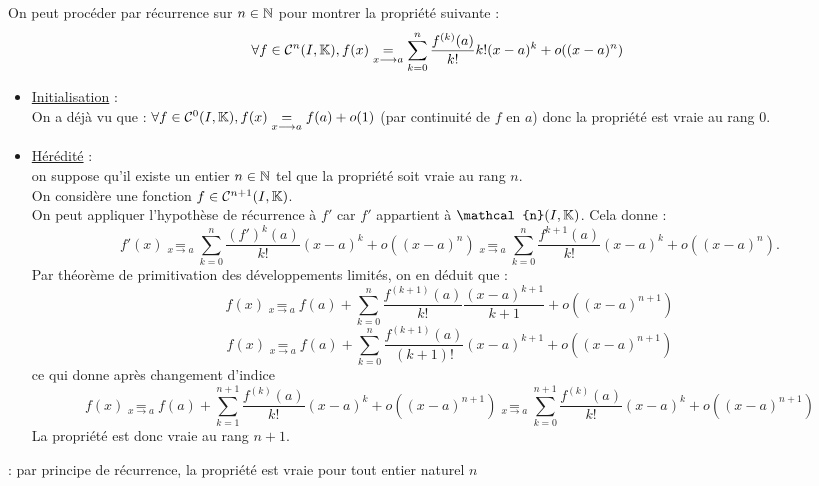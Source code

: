 \begin{dem}
    On peut procéder par récurrence sur \(n \in \mathbb{N}\) pour montrer la propriété suivante :
    \[\forall f \in \mathcal{C}^n(I, \mathbb{K}), f (x) \underset{x \longrightarrow a}{=}\sum^n_{k=0}\frac{f ^{(k)}(a)}{k!}k! (x - a)^k + o ((x - a)^n)\] 
    \begin{itemize}
        \item \underline{Initialisation} : \\
            On a déjà vu que : \(\forall f \in \mathcal{C}^0(I, \mathbb{K}), f (x) \underset{x \longrightarrow a}{=} f (a) + o(1)\) (par continuité de \(f\) en \(a\)) donc la propriété est vraie au rang \(0\).
        \item \underline{Hérédité} :\\ 
        on suppose qu’il existe un entier \(n \in \mathbb{N}\) tel que la propriété soit vraie au rang \(n\).\\
        On considère une fonction \(f \in \mathcal{C}^{n+1}(I, \mathbb{K})\). \\
        On peut appliquer l’hypothèse de récurrence à \(f '\) car \(f '\) appartient à \(\mathcal{n}(I, \K)\). Cela donne :
            \[f '(x) \underset{x \to a}{=} \sum^n_{k=0}\frac{(f ')^{k} (a)}{k!} (x - a)^k + o ((x - a)^n) \underset{x \to a}{=} \sum^n_{k=0}\frac{f ^{k+1}(a)}{k!} (x - a)^k + o ((x - a)^n) .\]
        Par théorème de primitivation des développements limités, on en déduit que :
            \[f (x) \underset{x \to a}{=} f (a) +\sum^n_{k=0} \frac{f^{(k+1)}(a)}{k!} \frac{(x - a)^{k+1}}{k + 1} + o ((x - a)^{n+1})\]
            \[f (x) \underset{x \to a}{=} f (a) + \sum^n_{k=0}\frac{f ^{(k+1)}(a)}{(k + 1)!} (x - a)^{k+1} + o ((x - a)^{n+1})\]
            ce qui donne après changement d’indice
            \[f (x) \underset{x \to a}{=} f (a) + \sum^{n+1}_{k=1}\frac{f ^{(k)}(a)}{k!} (x - a)^k + o ((x - a)^{n+1}) \underset{x \to a}{=} \sum^{n+1}_{k=0}\frac{f ^{(k)}(a)}{k!} (x - a)^k + o ((x - a)^{n+1})\]
        La propriété est donc vraie au rang \(n + 1\).\\
    \end{itemize}
    \conclusion : par principe de récurrence, la propriété est vraie pour tout entier naturel \(n\)
\end{dem}

